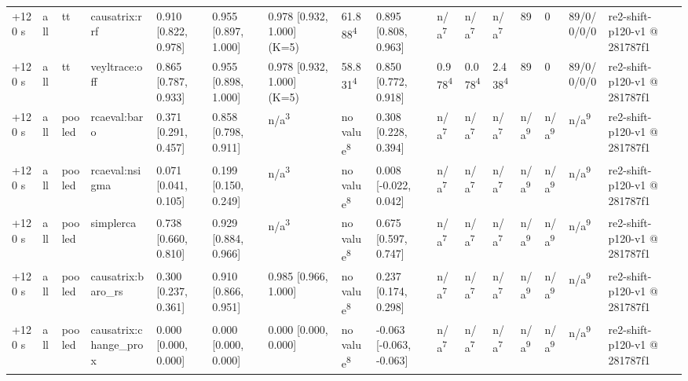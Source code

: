 \begin{table}[t]
\begin{tabular}{llllllllllllllll}
+120 s & all & tt & causatrix:rrf & 0.910 [0.822, 0.978] & 0.955 [0.897, 1.000] & 0.978 [0.932, 1.000] (K=5) & 61.888\textsuperscript{4} & 0.895 [0.808, 0.963] & n/a\textsuperscript{7} & n/a\textsuperscript{7} & n/a\textsuperscript{7} & 89 & 0 & 89/0/0/0/0 & re2-shift-p120-v1 @ 281787f1 \\
+120 s & all & tt & veyltrace:off & 0.865 [0.787, 0.933] & 0.955 [0.898, 1.000] & 0.978 [0.932, 1.000] (K=5) & 58.831\textsuperscript{4} & 0.850 [0.772, 0.918] & 0.978\textsuperscript{4} & 0.078\textsuperscript{4} & 2.438\textsuperscript{4} & 89 & 0 & 89/0/0/0/0 & re2-shift-p120-v1 @ 281787f1 \\
+120 s & all & pooled & rcaeval:baro & 0.371 [0.291, 0.457] & 0.858 [0.798, 0.911] & n/a\textsuperscript{3} & no value\textsuperscript{8} & 0.308 [0.228, 0.394] & n/a\textsuperscript{7} & n/a\textsuperscript{7} & n/a\textsuperscript{7} & n/a\textsuperscript{9} & n/a\textsuperscript{9} & n/a\textsuperscript{9} & re2-shift-p120-v1 @ 281787f1 \\
+120 s & all & pooled & rcaeval:nsigma & 0.071 [0.041, 0.105] & 0.199 [0.150, 0.249] & n/a\textsuperscript{3} & no value\textsuperscript{8} & 0.008 [-0.022, 0.042] & n/a\textsuperscript{7} & n/a\textsuperscript{7} & n/a\textsuperscript{7} & n/a\textsuperscript{9} & n/a\textsuperscript{9} & n/a\textsuperscript{9} & re2-shift-p120-v1 @ 281787f1 \\
+120 s & all & pooled & simplerca & 0.738 [0.660, 0.810] & 0.929 [0.884, 0.966] & n/a\textsuperscript{3} & no value\textsuperscript{8} & 0.675 [0.597, 0.747] & n/a\textsuperscript{7} & n/a\textsuperscript{7} & n/a\textsuperscript{7} & n/a\textsuperscript{9} & n/a\textsuperscript{9} & n/a\textsuperscript{9} & re2-shift-p120-v1 @ 281787f1 \\
+120 s & all & pooled & causatrix:baro\_rs & 0.300 [0.237, 0.361] & 0.910 [0.866, 0.951] & 0.985 [0.966, 1.000] & no value\textsuperscript{8} & 0.237 [0.174, 0.298] & n/a\textsuperscript{7} & n/a\textsuperscript{7} & n/a\textsuperscript{7} & n/a\textsuperscript{9} & n/a\textsuperscript{9} & n/a\textsuperscript{9} & re2-shift-p120-v1 @ 281787f1 \\
+120 s & all & pooled & causatrix:change\_prox & 0.000 [0.000, 0.000] & 0.000 [0.000, 0.000] & 0.000 [0.000, 0.000] & no value\textsuperscript{8} & -0.063 [-0.063, -0.063] & n/a\textsuperscript{7} & n/a\textsuperscript{7} & n/a\textsuperscript{7} & n/a\textsuperscript{9} & n/a\textsuperscript{9} & n/a\textsuperscript{9} & re2-shift-p120-v1 @ 281787f1 \\

\end{tabular}
\end{table}
